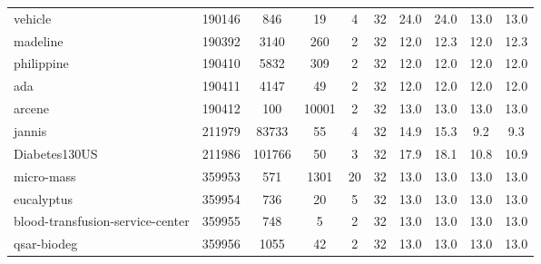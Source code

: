 \documentclass[11pt]{article}
\begin{document}
\begin{table}[H]
{\begin{tabular}{@{}lccccc|cc|cc@{}}
vehicle                                     & 190146         & 846         & 19         & 4         & 32          & 24.0                     & 24.0          & 13.0                        & 13.0              \\
madeline                                    & 190392         & 3140        & 260        & 2         & 32          & 12.0                     & 12.3          & 12.0                        & 12.3              \\
philippine                                  & 190410         & 5832        & 309        & 2         & 32          & 12.0                     & 12.0          & 12.0                        & 12.0              \\
ada                                         & 190411         & 4147        & 49         & 2         & 32          & 12.0                     & 12.0          & 12.0                        & 12.0              \\
arcene                                      & 190412         & 100         & 10001      & 2         & 32          & 13.0                     & 13.0          & 13.0                        & 13.0              \\
jannis                                      & 211979         & 83733       & 55         & 4         & 32          & 14.9                     & 15.3          & 9.2                         & 9.3               \\
Diabetes130US                               & 211986         & 101766      & 50         & 3         & 32          & 17.9                     & 18.1          & 10.8                        & 10.9              \\
micro-mass                                  & 359953         & 571         & 1301       & 20        & 32          & 13.0                     & 13.0          & 13.0                        & 13.0              \\
eucalyptus                                  & 359954         & 736         & 20         & 5         & 32          & 13.0                     & 13.0          & 13.0                        & 13.0              \\
blood-transfusion-service-center            & 359955         & 748         & 5          & 2         & 32          & 13.0                     & 13.0          & 13.0                        & 13.0              \\
qsar-biodeg                                 & 359956         & 1055        & 42         & 2         & 32          & 13.0                     & 13.0          & 13.0                        & 13.0              \\

\end{tabular}}
\end{table}
\end{document}
